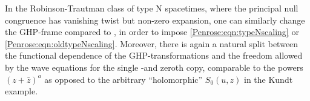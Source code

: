 
In the Robinson-Trautman class of type N spacetimes, where the principal null congruence has vanishing twist but
non-zero expansion, one can similarly change the GHP-frame compared to \cite{Godazgar:2020zbv}, in order to impose
\eqref{Penrose:eqn:typeNscaling} or \eqref{Penrose:eqn:oldtypeNscaling}. Moreover, there is again a natural split between the
functional dependence of the GHP-transformations and the freedom allowed by the wave equations for the single -and
zeroth copy, comparable to the powers $(z+\bar{z})^a$ as opposed to the arbitrary ``holomorphic'' $S_0(u,z)$ in the Kundt example.


